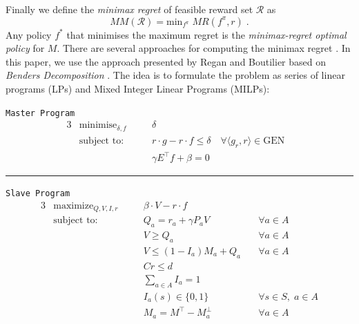 \documentclass[runningheads,a4paper]{llncs}
\begin{document}
Finally we define the \textit{minimax regret} of feasible reward set $\mathcal{R}$ as
$$MM(\mathcal{R}) = \text{min}_{f^{\pi}}\; MR(f^{\pi}, r)\;.$$
Any policy $f^*$  that minimises the maximum regret is the \textit{minimax-regret optimal policy} for $M$. There are several approaches for computing the minimax regret \cite{alizadeh2015,benavent2018,Regan2009,daSilva2011,Xu2009}. 
In this paper, we use the approach presented by Regan and Boutilier \citep{Regan2009} based on \textit{Benders Decomposition} \cite{Benders1962}.
 The idea is to formulate the problem as series of linear programs (LPs) and Mixed Integer Linear Programs (MILPs):


\begin{center}\label{minimax}
\texttt{Master Program}
\begin{alignat}{3}
&\text{minimise}_{\delta, f} && \delta & \\
&\text{subject to:}&\quad& r\cdot g - r \cdot f \leq \delta \quad \forall \langle g_r, r \rangle \in \text{GEN}\label{delta_cut}\\
&& \quad& \gamma E^{\top} f + \beta = 0 
\end{alignat}
\begin{center}
\noindent\rule{8cm}{0.4pt}
\end{center} 
\texttt{Slave Program}
\begin{alignat}{3}
&\text{maximize}_{Q, V, I, r} && \beta \cdot V - r \cdot f \\
&\text{subject to:} &\quad& Q_a = r_a + \gamma P_aV &\quad \forall a \in A\\
&& \quad& V \geq Q_a  &\quad \forall a \in A\\
&& \quad& V \leq (1-I_a)M_a + Q_a  &\quad \forall a \in A\\
&& \quad& Cr \leq d \\
&& \quad& \sum_{a \in A} I_a = 1  \label{eq:sum_I}\\
&& \quad& I_a(s) \in \{0, 1 \} &\quad \forall s \in S, \; a \in A \label{eq:bin_I}\\
&& \quad& M_a = M^{\top} - M_a^{\perp} &\quad \forall a \in A
\end{alignat}
\end{center}
\end{document}
